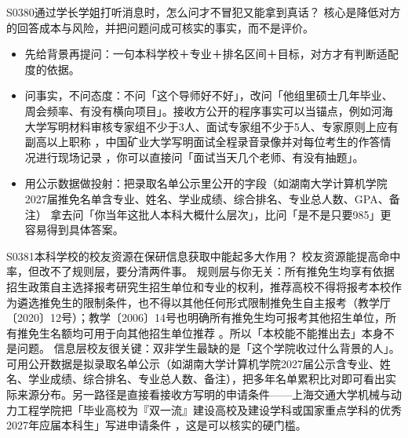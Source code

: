 \begin{qa}{S0380}{通过学长学姐打听消息时，怎么问才不冒犯又能拿到真话？}
核心是降低对方的回答成本与风险，并把问题问成可核实的事实，而不是评价。
\begin{itemize}
  \item 先给背景再提问：一句本科学校＋专业＋排名区间＋目标，对方才有判断适配度的依据。
  \item 问事实，不问态度：不问「这个导师好不好」，改问「他组里硕士几年毕业、周会频率、有没有横向项目」。接收方公开的程序事实可以当锚点，例如河海大学写明材料审核专家组不少于3人、面试专家组不少于5人、专家原则上应有副高以上职称 ，中国矿业大学写明面试全程录音录像并对每位考生的作答情况进行现场记录 ，你可以直接问「面试当天几个老师、有没有抽题」。
  \item 用公示数据做投射：把录取名单公示里公开的字段（如湖南大学计算机学院2027届推免名单含专业、姓名、学业成绩、综合排名、专业总人数、GPA、备注） 拿去问「你当年这批人本科大概什么层次」，比问「是不是只要985」更容易得到具体答案。
\end{itemize}
\end{qa}

\begin{qa}{S0381}{本科学校的校友资源在保研信息获取中能起多大作用？}
校友资源能提高命中率，但改不了规则层，要分清两件事。
规则层与你无关：所有推免生均享有依据招生政策自主选择报考研究生招生单位和专业的权利，推荐高校不得将报考本校作为遴选推免生的限制条件，也不得以其他任何形式限制推免生自主报考（教学厅〔2020〕12号）；教学〔2006〕14号也明确所有推免生均可报考其他招生单位，所有推免生名额均可用于向其他招生单位推荐 。所以「本校能不能推出去」本身不是问题。
信息层校友很关键：双非学生最缺的是「这个学院收过什么背景的人」。可用公开数据是拟录取名单公示（如湖南大学计算机学院2027届公示含专业、姓名、学业成绩、综合排名、专业总人数、备注），把多年名单累积比对即可看出实际来源分布。另一路径是直接看接收方写明的申请条件——上海交通大学机械与动力工程学院把「毕业高校为『双一流』建设高校及建设学科或国家重点学科的优秀2027年应届本科生」写进申请条件 ，这是可以核实的硬门槛。
\end{qa}

